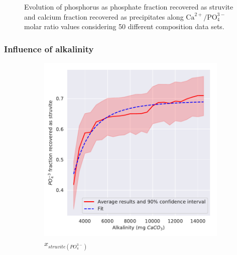 \begin{refsection}[referencesCh3]
\begin{figure}[h]
	\caption{Evolution of phosphorus as phosphate fraction recovered as struvite and calcium fraction recovered as precipitates along $\text{Ca}^{2+}/\text{PO}_{4}^{3-}$ molar ratio values considering 50 different composition data sets.}
	\label{fig:estimation_Ca_ca}
\end{figure}

\subsubsection{Influence of alkalinity}
\begin{figure}[h] 
	\centering
	\begin{subfigure}[t]{0.32\textheight}
		\includegraphics[width=\textwidth]{gfx/AppendixB/plotStrYield_Alk}
		\caption{$x_{struvite \left(PO_{4}^{3-}\right)}$}
		\label{fig:estimation_Alk_struviteYield}
	\end{subfigure}
	\begin{subfigure}[t]{0.32\textheight}

\end{subfigure}
\end{figure}
\end{refsection}
